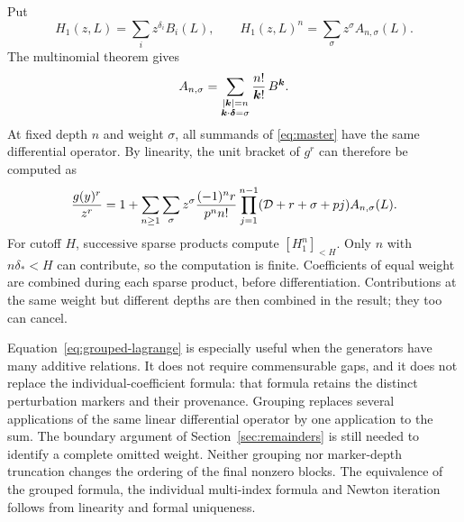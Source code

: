 Put
\[
 H_1(z,L)=\sum_i z^{\delta_i}B_i(L),\qquad
 H_1(z,L)^n=\sum_\sigma z^\sigma A_{n,\sigma}(L).
\]
The multinomial theorem gives
\[
 A_{n,\sigma}=
 \sum_{\substack{|\boldsymbol k|=n\\\boldsymbol k\cdot\boldsymbol\delta=\sigma}}
 \frac{n!}{\boldsymbol k!}\,B^{\boldsymbol k}.
\]
At fixed depth $n$ and weight $\sigma$, all summands of
\eqref{eq:master} have the same differential operator. By linearity, the unit
bracket of $g^r$ can therefore be computed as
\begin{equation}
 \frac{g(y)^r}{z^r}
 =1+\sum_{n\ge1}\sum_\sigma z^\sigma
 \frac{(-1)^n r}{p^n n!}
 \prod_{j=1}^{n-1}(\mathcal D+r+\sigma+pj)A_{n,\sigma}(L).
 \label{eq:grouped-lagrange}
\end{equation}
For cutoff $H$, successive sparse products compute
$[H_1^n]_{<H}$. Only $n$ with $n\delta_*<H$ can contribute, so the computation
is finite. Coefficients of equal weight are combined during each sparse
product, before differentiation. Contributions at the same weight but
different depths are then combined in the result; they too can cancel.

Equation~\eqref{eq:grouped-lagrange} is especially useful when the generators
have many additive relations. It does not require commensurable gaps, and it
does not replace the individual-coefficient formula: that formula
retains the distinct perturbation markers and their provenance. Grouping replaces several applications of the same linear differential
operator by one application to the sum. The boundary argument of
Section~\ref{sec:remainders} is still needed to identify a complete omitted
weight. Neither grouping nor marker-depth truncation changes the ordering
of the final nonzero blocks. The equivalence of the grouped formula,
the individual multi-index formula and Newton iteration follows from
linearity and formal uniqueness.
